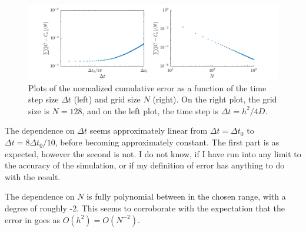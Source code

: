 \documentclass[a4paper,10pt]{article} 	%
\numberwithin{equation}{section}
\begin{document}
	\begin{figure}[H]
		\centering
		\includegraphics[width = \linewidth]{diffErr.pdf}
		\caption{Plots of the normalized cumulative error as a function of the time step size $ \Delta t $ (left) and grid size $ N $ (right). On the right plot, the grid size is $ N = 128 $, and on the left plot, the time step is $ \Delta t = h^2/4D $.}
		\label{fig:diffErr}
	\end{figure}
	The dependence on $ \Delta t $ seems approximately linear from $ \Delta t =  \Delta t_0$ to $ \Delta t = 8\Delta t_0/10 $, before becoming approximately constant. The first part is as expected, however the second is not. I do not know, if I have run into any limit to the accuracy of the simulation, or if my definition of error has anything to do with the result.
	
	The dependence on $ N $ is fully polynomial between in the chosen range, with a degree of roughly -2. This seems to corroborate with the expectation that the error in goes as $ O(h^2) = O(N^{-2})$.
	
\end{document}
